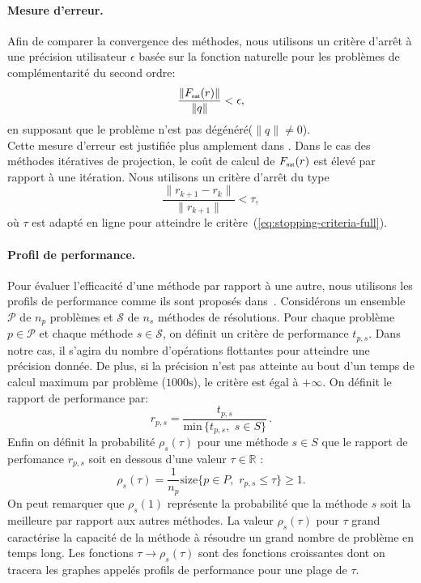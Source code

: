 \documentclass{CSMA2017}
\def\nat{{\hbox{\sf \tiny{nat}}}}
\begin{document}
\paragraph{Mesure d'erreur.} 
Afin de comparer la convergence des méthodes, nous utilisons un critère d'arrêt à une précision utilisateur $\epsilon$ basée sur la fonction naturelle pour les problèmes de complémentarité du second ordre:
\begin{equation}
  \label{eq:stopping-criteria-full}
  \displaystyle\frac{\|F_\nat(r)\|}{\|q\|} < \epsilon,
\end{equation}
en supposant que le problème n'est pas dégénéré($\|q\| \neq 0$). \\
%
Cette mesure d'erreur est justifiée plus amplement dans \cite{Facchinei.Pang2003}. Dans le cas des méthodes itératives de projection, le coût de calcul de $F_\nat(r)$ est élevé par rapport à une itération. Nous utilisons un critère d'arrêt du type 
\begin{equation}
  \label{eq:stopping-criteria-light}
  \displaystyle\frac{\|r_{k+1}- r_{k}\|}{\|r_{k+1}\|} < \tau,
\end{equation}
où $\tau$ est adapté en ligne pour atteindre le critère~(\ref{eq:stopping-criteria-full}).

\paragraph{Profil de performance.} 
Pour évaluer l'efficacité d'une méthode par rapport à une autre, nous utilisons les profils de performance comme ils sont proposés dans~\cite{DolanMore_MP2002}. Considérons un ensemble $\mathcal P$ de $n_p$ problèmes et $\mathcal S$  de $n_s$ méthodes de résolutions. Pour chaque problème $p\in \mathcal P$ et chaque méthode $s \in \mathcal S$, on définit un critère de performance $t_{p,s}$. Dans notre cas, il s'agira du nombre d'opérations flottantes pour atteindre une précision donnée. De plus, si la précision n'est pas atteinte au bout d'un temps de calcul maximum par problème ($1000\si{\second}$), le critère est égal à $+\infty$. On définit le rapport de performance par:  
\begin{equation}
 r_{p, s} = \frac{t_{p,s}}{\text{min}\, \{t_{p,s}, \, \, s \in S\}} \, .
\end{equation}
Enfin on définit la probabilité  $\rho_s(\tau)$ pour une méthode $s \in S$ que le rapport de perfomance $r_{p, s}$ soit en dessous d'une valeur $\tau \in \mathbb R$ :
\begin{equation}
 \rho_s(\tau) = \frac{1}{n_p} \text{size} \{p \in P, \, \, r_{p, s} \leq \tau\} \geq 1.
\end{equation}
On peut remarquer que $\rho_s(1)$ représente la probabilité que la méthode $s$ soit la meilleure par rapport aux autres méthodes. La valeur $\rho_s(\tau)$ pour $\tau$ grand caractérise la capacité de la méthode à résoudre un grand nombre de problème en temps long. Les fonctions $\tau \rightarrow \rho_s(\tau) $ sont des fonctions croissantes dont  on tracera les graphes appelés profils de performance pour une plage de $\tau$. 
\end{document}
